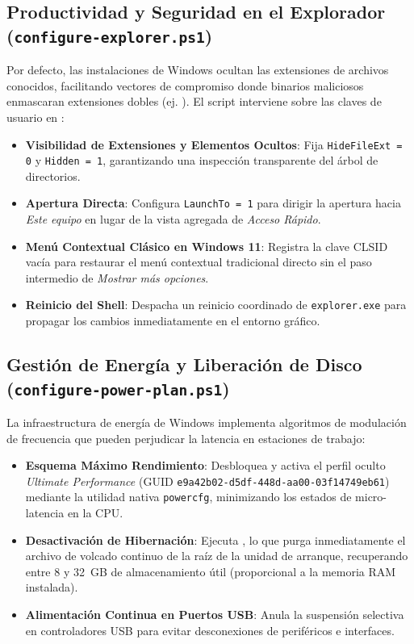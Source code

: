 \documentclass[12pt,a4paper]{report}
\begin{document}
\subsection{Productividad y Seguridad en el Explorador (\texttt{configure-explorer.ps1})}
Por defecto, las instalaciones de Windows ocultan las extensiones de archivos conocidos, facilitando vectores de compromiso donde binarios maliciosos enmascaran extensiones dobles (ej. ). El script interviene sobre las claves de usuario en :
\begin{itemize}
    \item \textbf{Visibilidad de Extensiones y Elementos Ocultos}: Fija \texttt{HideFileExt = 0} y \texttt{Hidden = 1}, garantizando una inspección transparente del árbol de directorios.
    \item \textbf{Apertura Directa}: Configura \texttt{LaunchTo = 1} para dirigir la apertura hacia \textit{Este equipo} en lugar de la vista agregada de \textit{Acceso Rápido}.
    \item \textbf{Menú Contextual Clásico en Windows 11}: Registra la clave CLSID  vacía para restaurar el menú contextual tradicional directo sin el paso intermedio de \textit{Mostrar más opciones}.
    \item \textbf{Reinicio del Shell}: Despacha un reinicio coordinado de \texttt{explorer.exe} para propagar los cambios inmediatamente en el entorno gráfico.
\end{itemize}

\subsection{Gestión de Energía y Liberación de Disco (\texttt{configure-power-plan.ps1})}
La infraestructura de energía de Windows implementa algoritmos de modulación de frecuencia que pueden perjudicar la latencia en estaciones de trabajo:
\begin{itemize}
    \item \textbf{Esquema Máximo Rendimiento}: Desbloquea y activa el perfil oculto \textit{Ultimate Performance} (GUID \texttt{e9a42b02-d5df-448d-aa00-03f14749eb61}) mediante la utilidad nativa \texttt{powercfg}, minimizando los estados de micro-latencia en la CPU.
    \item \textbf{Desactivación de Hibernación}: Ejecuta , lo que purga inmediatamente el archivo de volcado continuo  de la raíz de la unidad de arranque, recuperando entre 8 y 32~GB de almacenamiento útil (proporcional a la memoria RAM instalada).
    \item \textbf{Alimentación Continua en Puertos USB}: Anula la suspensión selectiva en controladores USB para evitar desconexiones de periféricos e interfaces.
\end{itemize}
\end{document}
